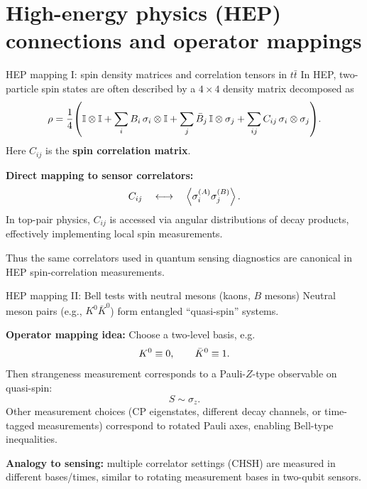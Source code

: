 \documentclass[aspectratio=169]{beamer}
\newcommand{\Id}{\mathbb{I}}
\newcommand{\sA}[1]{\sigma_{#1}^{(A)}}
\newcommand{\sB}[1]{\sigma_{#1}^{(B)}}
\begin{document}
\section{High-energy physics (HEP) connections and operator mappings}

\begin{frame}{HEP mapping I: spin density matrices and correlation tensors in $t\bar t$}
\small
In HEP, two-particle spin states are often described by a $4\times 4$ density matrix decomposed as
\[
\rho
=
\frac14\qty(
\Id\otimes\Id
+\sum_i B_i\,\sigma_i\otimes\Id
+\sum_j \bar B_j\,\Id\otimes\sigma_j
+\sum_{ij} C_{ij}\,\sigma_i\otimes\sigma_j
).
\]
Here $C_{ij}$ is the \textbf{spin correlation matrix}.

\vspace{0.35em}
\textbf{Direct mapping to sensor correlators:}
\[
C_{ij}\quad \longleftrightarrow\quad \expval{\sA{i}\sB{j}}.
\]
In top-pair physics, $C_{ij}$ is accessed via angular distributions of decay products, effectively implementing local spin measurements. \citep{BernreutherHeislerSi2015JHEP}

\vspace{0.35em}
Thus the same correlators used in quantum sensing diagnostics are canonical in HEP spin-correlation measurements.
\end{frame}

\begin{frame}{HEP mapping II: Bell tests with neutral mesons (kaons, $B$ mesons)}
\small
Neutral meson pairs (e.g., $K^0\bar K^0$) form entangled ``quasi-spin'' systems. \citep{BertlmannHiesmayr2001PRA}

\vspace{0.25em}
\textbf{Operator mapping idea:}
Choose a two-level basis, e.g.
\[
\relax{K^0}\equiv\relax{0},\qquad \relax{\bar K^0}\equiv\relax{1}.
\]
Then strangeness measurement corresponds to a Pauli-$Z$-type observable on quasi-spin:
\[
S \sim \sigma_z.
\]
Other measurement choices (CP eigenstates, different decay channels, or time-tagged measurements) correspond to rotated Pauli axes, enabling Bell-type inequalities.

\vspace{0.35em}
\textbf{Analogy to sensing:}
multiple correlator settings (CHSH) are measured in different bases/times, similar to rotating measurement bases in two-qubit sensors.
\end{frame}
\end{document}
